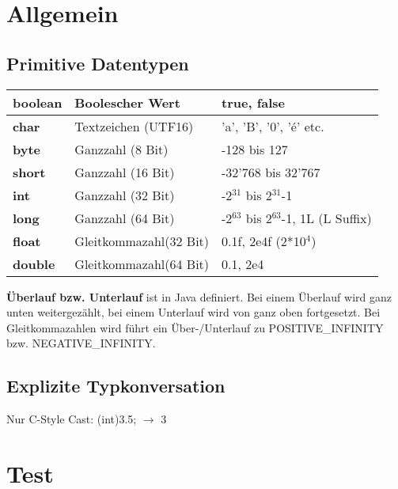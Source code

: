\vspace{-0.5cm}
\section*{Allgemein}
	\begin{minipage}[t]{10cm}
		\subsection*{Primitive Datentypen}
			\begin{tabular}{|>{\bfseries}l l l|}
				\hline   boolean & Boolescher Wert & true, false
				\\\hline char & Textzeichen (UTF16) & 'a', 'B', '0', 'é' etc.
				\\\hline byte & Ganzzahl (8 Bit) & -128 bis 127
				\\\hline short & Ganzzahl (16 Bit) & -32'768 bis 32'767
				\\\hline int & Ganzzahl (32 Bit) & -2$^{31}$ bis 2$^{31}$-1
				\\\hline long & Ganzzahl (64 Bit) & -2$^{63}$ bis 2$^{63}$-1, 1L (L Suffix)
				\\\hline float & Gleitkommazahl(32 Bit) & 0.1f, 2e4f (2*10$^4$)
				\\\hline double & Gleitkommazahl(64 Bit) & 0.1, 2e4 
				\\\hline
			\end{tabular}
		\end{minipage}
		\hspace*{0.6cm}
		\begin{minipage}[t]{8.4cm}
			\vspace*{0.7cm}
			\textbf{Überlauf bzw. Unterlauf} ist in Java definiert. Bei einem Überlauf wird ganz unten weitergezählt, bei einem Unterlauf wird von ganz oben fortgesetzt. Bei Gleitkommazahlen wird führt ein Über-/Unterlauf zu POSITIVE\_INFINITY bzw. NEGATIVE\_INFINITY.
			\subsection*{Explizite Typkonversation}
			Nur C-Style Cast: (int)3.5; $\rightarrow$ 3
			\\
		\end{minipage}
	
	\vspace{0.3cm}
	\vspace{0.3cm}
	\section*{Test}
	